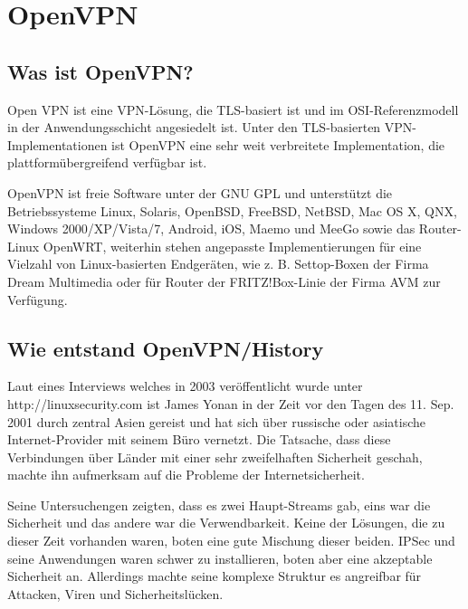 \documentclass[12pt]{scrartcl}
\begin{document}
\section{OpenVPN}
%

\subsection{Was ist OpenVPN?}


Open VPN ist eine VPN-Lösung, die TLS-basiert ist und im OSI-Referenzmodell in der Anwendungsschicht angesiedelt ist. Unter den TLS-basierten VPN-Implementationen ist OpenVPN eine sehr weit verbreitete Implementation, die plattformübergreifend verfügbar ist.

OpenVPN ist freie Software unter der GNU GPL und unterstützt die Betriebssysteme Linux, Solaris, OpenBSD, FreeBSD, NetBSD, Mac OS X, QNX, Windows 2000/XP/Vista/7, Android, iOS, Maemo und MeeGo sowie das Router-Linux OpenWRT, weiterhin stehen angepasste Implementierungen für eine Vielzahl von Linux-basierten Endgeräten, wie z. B. Settop-Boxen der Firma Dream Multimedia oder für Router der FRITZ!Box-Linie der Firma AVM zur Verfügung.

\subsection{Wie entstand OpenVPN/History}

Laut eines Interviews welches in 2003 veröffentlicht wurde unter http://linuxsecurity.com ist James Yonan in der Zeit vor den Tagen des 11. Sep. 2001 durch zentral Asien gereist und hat sich über russische oder asiatische Internet-Provider mit seinem Büro vernetzt. Die Tatsache, dass diese Verbindungen über Länder mit einer sehr zweifelhaften Sicherheit geschah, machte ihn aufmerksam auf die Probleme der Internetsicherheit. 

Seine Untersuchengen zeigten, dass es zwei Haupt-Streams gab, eins war die Sicherheit und das andere war die Verwendbarkeit. Keine der Lösungen, die zu dieser Zeit vorhanden waren, boten eine gute Mischung dieser beiden.
IPSec  und seine Anwendungen waren schwer zu installieren, boten aber eine akzeptable Sicherheit an. Allerdings machte seine komplexe Struktur es angreifbar für Attacken, Viren und Sicherheitslücken. 
\end{document}
